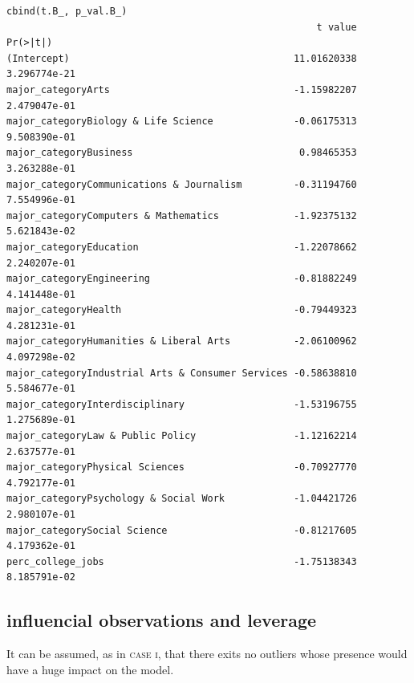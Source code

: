 \documentclass[10pt, twoside, openleft]{article}
\begin{document}
\begin{verbatim}
cbind(t.B_, p_val.B_)
                                                      t value     Pr(>|t|)
(Intercept)                                       11.01620338 3.296774e-21
major_categoryArts                                -1.15982207 2.479047e-01
major_categoryBiology & Life Science              -0.06175313 9.508390e-01
major_categoryBusiness                             0.98465353 3.263288e-01
major_categoryCommunications & Journalism         -0.31194760 7.554996e-01
major_categoryComputers & Mathematics             -1.92375132 5.621843e-02
major_categoryEducation                           -1.22078662 2.240207e-01
major_categoryEngineering                         -0.81882249 4.141448e-01
major_categoryHealth                              -0.79449323 4.281231e-01
major_categoryHumanities & Liberal Arts           -2.06100962 4.097298e-02
major_categoryIndustrial Arts & Consumer Services -0.58638810 5.584677e-01
major_categoryInterdisciplinary                   -1.53196755 1.275689e-01
major_categoryLaw & Public Policy                 -1.12162214 2.637577e-01
major_categoryPhysical Sciences                   -0.70927770 4.792177e-01
major_categoryPsychology & Social Work            -1.04421726 2.980107e-01
major_categorySocial Science                      -0.81217605 4.179362e-01
perc_college_jobs                                 -1.75138343 8.185791e-02
\end{verbatim}

\begin{center}
\subsection{influencial observations and leverage}
\vspace{-3ex}
\end{center}

\noindent
It can be assumed, as in \textsc{case i}, that there exits no outliers whose presence
would have a huge impact on the model.
\smallskip
\end{document}
